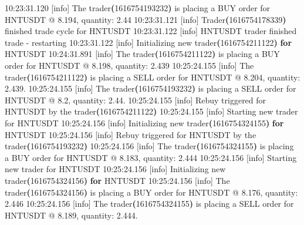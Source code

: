 \documentclass[
]{book}
\newenvironment{Shaded}{\begin{snugshade}}{\end{snugshade}}
\newcommand{\AttributeTok}[1]{\textcolor[rgb]{0.77,0.63,0.00}{#1}}
\newcommand{\ControlFlowTok}[1]{\textcolor[rgb]{0.13,0.29,0.53}{\textbf{#1}}}
\newcommand{\ErrorTok}[1]{\textcolor[rgb]{0.64,0.00,0.00}{\textbf{#1}}}
\newcommand{\ExtensionTok}[1]{#1}
\newcommand{\KeywordTok}[1]{\textcolor[rgb]{0.13,0.29,0.53}{\textbf{#1}}}
\newcommand{\NormalTok}[1]{#1}
\begin{document}
\begin{Shaded}
\begin{Highlighting}[]
\ExtensionTok{10:23:31.120}\NormalTok{ [info]  The trader}\ErrorTok{(}\ExtensionTok{1616754193232}\KeywordTok{)} \ExtensionTok{is}\NormalTok{ placing a BUY order for HNTUSDT @ 8.194, quantity: 2.44}
\ExtensionTok{10:23:31.121}\NormalTok{ [info]  Trader}\ErrorTok{(}\ExtensionTok{1616754178339}\KeywordTok{)} \ExtensionTok{finished}\NormalTok{ trade cycle for HNTUSDT}
\ExtensionTok{10:23:31.122}\NormalTok{ [info]  HNTUSDT trader finished trade }\AttributeTok{{-}}\NormalTok{ restarting}
\ExtensionTok{10:23:31.122}\NormalTok{ [info]  Initializing new trader}\ErrorTok{(}\ExtensionTok{1616754211122}\KeywordTok{)} \ControlFlowTok{for}\NormalTok{ HNTUSDT}
\ExtensionTok{10:24:31.891}\NormalTok{ [info]  The trader}\ErrorTok{(}\ExtensionTok{1616754211122}\KeywordTok{)} \ExtensionTok{is}\NormalTok{ placing a BUY order for HNTUSDT @ 8.198, quantity: 2.439}
\ExtensionTok{10:25:24.155}\NormalTok{ [info]  The trader}\ErrorTok{(}\ExtensionTok{1616754211122}\KeywordTok{)} \ExtensionTok{is}\NormalTok{ placing a SELL order for HNTUSDT @ 8.204, quantity: 2.439.}
\ExtensionTok{10:25:24.155}\NormalTok{ [info]  The trader}\ErrorTok{(}\ExtensionTok{1616754193232}\KeywordTok{)} \ExtensionTok{is}\NormalTok{ placing a SELL order for HNTUSDT @ 8.2, quantity: 2.44.}
\ExtensionTok{10:25:24.155}\NormalTok{ [info]  Rebuy triggered for HNTUSDT by the trader}\ErrorTok{(}\ExtensionTok{1616754211122}\KeywordTok{)}
\ExtensionTok{10:25:24.155}\NormalTok{ [info]  Starting new trader for HNTUSDT}
\ExtensionTok{10:25:24.156}\NormalTok{ [info]  Initializing new trader}\ErrorTok{(}\ExtensionTok{1616754324155}\KeywordTok{)} \ControlFlowTok{for}\NormalTok{ HNTUSDT}
\ExtensionTok{10:25:24.156}\NormalTok{ [info]  Rebuy triggered for HNTUSDT by the trader}\ErrorTok{(}\ExtensionTok{1616754193232}\KeywordTok{)}
\ExtensionTok{10:25:24.156}\NormalTok{ [info]  The trader}\ErrorTok{(}\ExtensionTok{1616754324155}\KeywordTok{)} \ExtensionTok{is}\NormalTok{ placing a BUY order for HNTUSDT @ 8.183, quantity: 2.444}
\ExtensionTok{10:25:24.156}\NormalTok{ [info]  Starting new trader for HNTUSDT}
\ExtensionTok{10:25:24.156}\NormalTok{ [info]  Initializing new trader}\ErrorTok{(}\ExtensionTok{1616754324156}\KeywordTok{)} \ControlFlowTok{for}\NormalTok{ HNTUSDT }
\ExtensionTok{10:25:24.156}\NormalTok{ [info]  The trader}\ErrorTok{(}\ExtensionTok{1616754324156}\KeywordTok{)} \ExtensionTok{is}\NormalTok{ placing a BUY order for HNTUSDT @ 8.176, quantity: 2.446}
\ExtensionTok{10:25:24.156}\NormalTok{ [info]  The trader}\ErrorTok{(}\ExtensionTok{1616754324155}\KeywordTok{)} \ExtensionTok{is}\NormalTok{ placing a SELL order for HNTUSDT @ 8.189, quantity: 2.444.}

\end{Highlighting}
\end{Shaded}
\end{document}
